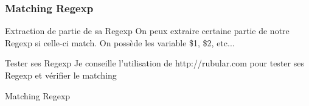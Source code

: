 \documentclass{beamer}
\begin{document}
\begin{frame}
  \frametitle{Matching Regexp}
  \begin{block}{Extraction de partie de sa Regexp}
    On peux extraire certaine partie de notre Regexp si celle-ci match. On possède les
    variable \$1, \$2, etc...
  \end{block}

  \begin{block}{Tester ses Regexp}
    Je conseille l'utilisation de http://rubular.com pour tester ses Regexp et
    v\'erifier le matching
  \end{block}
\end{frame}

\begin{frame}
  \begin{block}{Matching Regexp}
    
  \end{block}
\end{frame}
\end{document}
